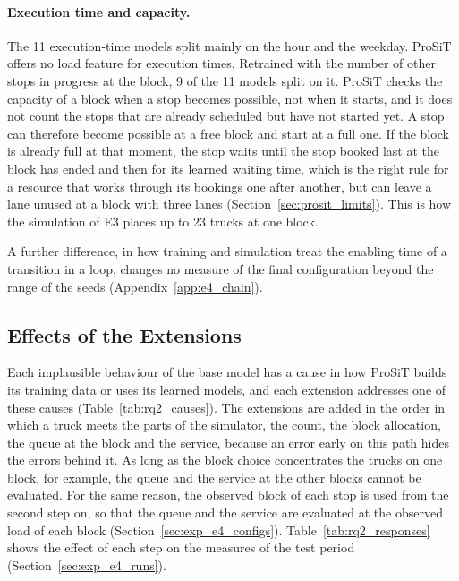 \paragraph{Execution time and capacity.} The 11 execution-time models split
mainly on the hour and the weekday. ProSiT offers no load feature for execution
times. Retrained with the number of other stops in progress at the block, 9 of the
11 models split on it. ProSiT checks the capacity of a block when a stop becomes
possible, not when it starts, and it does not count the stops that are already
scheduled but have not started yet. A stop can therefore become possible at a free
block and start at a full one. If the block is already full at that moment, the stop
waits until the stop booked last at the block has ended and then for its learned
waiting time, which is the right rule for a resource that works through its bookings
one after another, but can leave a lane unused at a block with three lanes
(Section~\ref{sec:prosit_limits}). This is how the simulation of E3 places up to 23
trucks at one block.

A further difference, in how training and simulation treat the enabling time of a
transition in a loop, changes no measure of the final configuration beyond the range
of the seeds (Appendix~\ref{app:e4_chain}).

\subsection{Effects of the Extensions}
\label{sec:res_e4_chain}
\label{sec:res_e4_selection}
\label{sec:res_e4_loo}

Each implausible behaviour of the base model has a cause in how ProSiT builds its
training data or uses its learned models, and each extension addresses one of these
causes (Table~\ref{tab:rq2_causes}). The extensions are added in the order in which
a truck meets the parts of the simulator, the count, the block allocation, the queue
at the block and the service, because an error early on this path hides the errors
behind it. As long as the block choice concentrates the trucks on one block, for
example, the queue and the service at the other blocks cannot be evaluated. For the same
reason, the observed block of each stop is used from the second step on, so that the
queue and the service are evaluated at the observed load of each block
(Section~\ref{sec:exp_e4_configs}). Table~\ref{tab:rq2_responses} shows the effect of
each step on the measures of the test period (Section~\ref{sec:exp_e4_runs}).

